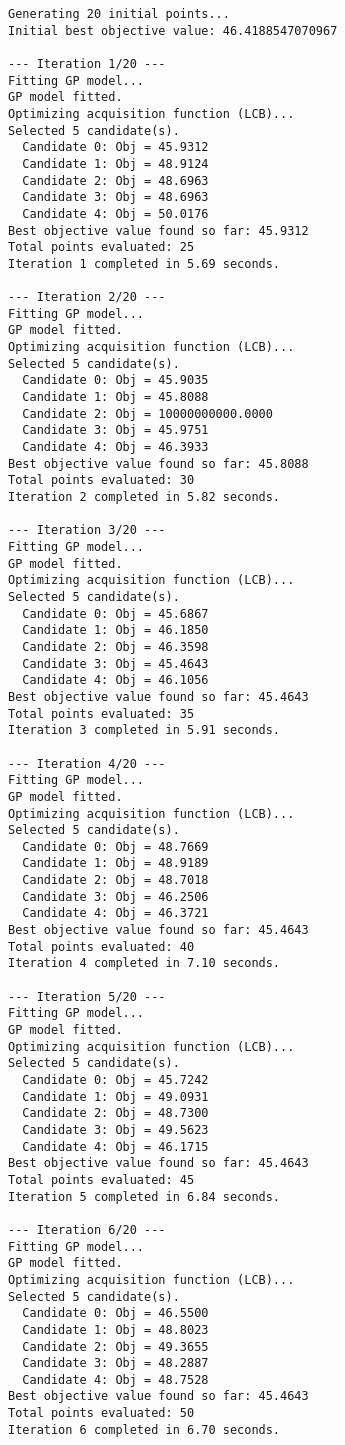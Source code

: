\documentclass[
  letterpaper,
  DIV=11,
  numbers=noendperiod]{scrartcl}
\begin{document}
\begin{verbatim}
Generating 20 initial points...
Initial best objective value: 46.4188547070967

--- Iteration 1/20 ---
Fitting GP model...
GP model fitted.
Optimizing acquisition function (LCB)...
Selected 5 candidate(s).
  Candidate 0: Obj = 45.9312
  Candidate 1: Obj = 48.9124
  Candidate 2: Obj = 48.6963
  Candidate 3: Obj = 48.6963
  Candidate 4: Obj = 50.0176
Best objective value found so far: 45.9312
Total points evaluated: 25
Iteration 1 completed in 5.69 seconds.

--- Iteration 2/20 ---
Fitting GP model...
GP model fitted.
Optimizing acquisition function (LCB)...
Selected 5 candidate(s).
  Candidate 0: Obj = 45.9035
  Candidate 1: Obj = 45.8088
  Candidate 2: Obj = 10000000000.0000
  Candidate 3: Obj = 45.9751
  Candidate 4: Obj = 46.3933
Best objective value found so far: 45.8088
Total points evaluated: 30
Iteration 2 completed in 5.82 seconds.

--- Iteration 3/20 ---
Fitting GP model...
GP model fitted.
Optimizing acquisition function (LCB)...
Selected 5 candidate(s).
  Candidate 0: Obj = 45.6867
  Candidate 1: Obj = 46.1850
  Candidate 2: Obj = 46.3598
  Candidate 3: Obj = 45.4643
  Candidate 4: Obj = 46.1056
Best objective value found so far: 45.4643
Total points evaluated: 35
Iteration 3 completed in 5.91 seconds.

--- Iteration 4/20 ---
Fitting GP model...
GP model fitted.
Optimizing acquisition function (LCB)...
Selected 5 candidate(s).
  Candidate 0: Obj = 48.7669
  Candidate 1: Obj = 48.9189
  Candidate 2: Obj = 48.7018
  Candidate 3: Obj = 46.2506
  Candidate 4: Obj = 46.3721
Best objective value found so far: 45.4643
Total points evaluated: 40
Iteration 4 completed in 7.10 seconds.

--- Iteration 5/20 ---
Fitting GP model...
GP model fitted.
Optimizing acquisition function (LCB)...
Selected 5 candidate(s).
  Candidate 0: Obj = 45.7242
  Candidate 1: Obj = 49.0931
  Candidate 2: Obj = 48.7300
  Candidate 3: Obj = 49.5623
  Candidate 4: Obj = 46.1715
Best objective value found so far: 45.4643
Total points evaluated: 45
Iteration 5 completed in 6.84 seconds.

--- Iteration 6/20 ---
Fitting GP model...
GP model fitted.
Optimizing acquisition function (LCB)...
Selected 5 candidate(s).
  Candidate 0: Obj = 46.5500
  Candidate 1: Obj = 48.8023
  Candidate 2: Obj = 49.3655
  Candidate 3: Obj = 48.2887
  Candidate 4: Obj = 48.7528
Best objective value found so far: 45.4643
Total points evaluated: 50
Iteration 6 completed in 6.70 seconds.


\end{verbatim}
\end{document}
